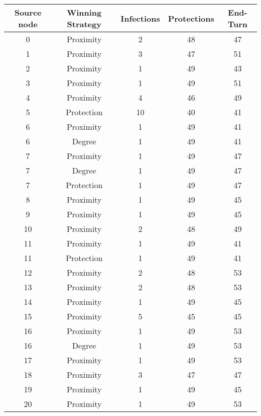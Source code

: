 \documentclass[results.tex]{subfiles}
\begin{document}
\begin{center}
  \begin{tabular}{| c || c | c | c | c |}
    \hline
    {\bfseries Source node} & {\bfseries Winning Strategy} & {\bfseries Infections} & {\bfseries Protections} & {\bfseries End-Turn} \\  %
    \hline\hline
    0 & Proximity & 2 & 48 & 47 \\ 
    \hline
    1 & Proximity & 3 & 47 & 51 \\ 
    \hline
    2 & Proximity & 1 & 49 & 43 \\ 
    \hline
    3 & Proximity & 1 & 49 & 51 \\ 
    \hline
    4 & Proximity & 4 & 46 & 49 \\ 
    \hline
    5 & Protection & 10 & 40 & 41 \\ 
    \hline
    6 & Proximity & 1 & 49 & 41 \\ 
    \hline
    6 & Degree & 1 & 49 & 41 \\ 
    \hline
    7 & Proximity & 1 & 49 & 47 \\ 
    \hline
    7 & Degree & 1 & 49 & 47 \\ 
    \hline
    7 & Protection & 1 & 49 & 47 \\ 
    \hline
    8 & Proximity & 1 & 49 & 45 \\ 
    \hline
    9 & Proximity & 1 & 49 & 45 \\ 
    \hline
    10 & Proximity & 2 & 48 & 49 \\ 
    \hline
    11 & Proximity & 1 & 49 & 41 \\ 
    \hline
    11 & Protection & 1 & 49 & 41 \\ 
    \hline
    12 & Proximity & 2 & 48 & 53 \\ 
    \hline
    13 & Proximity & 2 & 48 & 53 \\ 
    \hline
    14 & Proximity & 1 & 49 & 45 \\ 
    \hline
    15 & Proximity & 5 & 45 & 45 \\ 
    \hline
    16 & Proximity & 1 & 49 & 53 \\ 
    \hline
    16 & Degree & 1 & 49 & 53 \\ 
    \hline
    17 & Proximity & 1 & 49 & 53 \\ 
    \hline
    18 & Proximity & 3 & 47 & 47 \\ 
    \hline
    19 & Proximity & 1 & 49 & 45 \\ 
    \hline
    20 & Proximity & 1 & 49 & 53 \\ 

\end{tabular}
\end{center}
\end{document}
